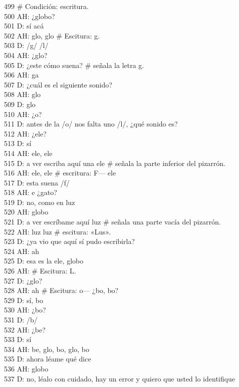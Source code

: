 499 \# Condición: escritura.\\
500 AH: ¿globo?\\
501 D: sí acá\\
502 AH: glo, glo \# Escitura: g.\\
503 D: /g/ /l/\\
504 AH: ¿glo?\\
505 D: ¿este cómo suena? \# señala la letra g.\\
506 AH: ga\\
507 D: ¿cuál es el siguiente sonido?\\
508 AH: glo\\
509 D: glo\\
510 AH: ¿o?\\
511 D: antes de la /o/ nos falta uno /l/, ¿qué sonido es?\\
512 AH: ¿ele?\\
513 D: sí\\
514 AH: ele, ele\\
515 D: a ver escriba aquí una ele \# señala la parte inferior del pizarrón.\\
516 AH: ele, ele \# escritura: F--- ele\\
517 D: esta suena /f/\\
518 AH: e ¿gato?\\
519 D: no, como en luz\\
520 AH: globo\\
521 D: a ver escríbame aquí luz \# señala una parte vacía del pizarrón.\\
522 AH: luz luz \# escitura: «Lus».\\
523 D: ¿ya vio que aquí sí pudo escribirla?\\
524 AH: ah\\
525 D: esa es la ele, globo\\
526 AH: \# Escitura: L.\\
527 D: ¿glo?\\
528 AH: ah \# Escitura: o--- ¿bo, bo?\\
529 D: sí, bo\\
530 AH: ¿bo?\\
531 D: /b/\\
532 AH: ¿be?\\
533 D: sí\\
534 AH: be, glo, bo, glo, bo\\
535 D: ahora léame qué dice\\
536 AH: globo\\
537 D: no, léalo con cuidado, hay un error y quiero que usted lo identifique\\
